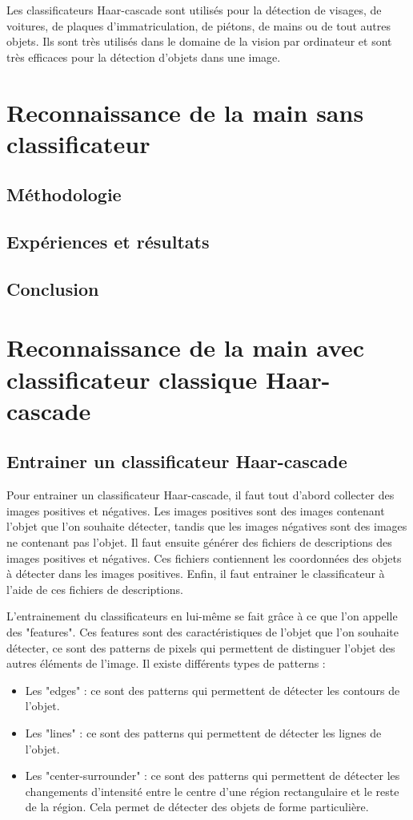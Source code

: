 \documentclass[11pt]{article}
\begin{document}
Les classificateurs Haar-cascade sont utilisés pour la détection de visages, de voitures, de plaques d'immatriculation, de piétons, de mains ou de tout autres objets. Ils sont très utilisés dans le domaine de la vision par ordinateur et sont très efficaces pour la détection d'objets dans une image. \bigbreak

\newpage

\section{Reconnaissance de la main sans classificateur}
\subsection{Méthodologie}
\subsection{Expériences et résultats}
\subsection{Conclusion}
\newpage

\section{Reconnaissance de la main avec classificateur classique Haar-cascade}
\subsection{Entrainer un classificateur Haar-cascade}
Pour entrainer un classificateur Haar-cascade, il faut tout d'abord collecter des images positives et négatives. Les images positives sont des images contenant l'objet que l'on souhaite détecter, tandis que les images négatives sont des images ne contenant pas l'objet. Il faut ensuite générer des fichiers de descriptions des images positives et négatives. Ces fichiers contiennent les coordonnées des objets à détecter dans les images positives. Enfin, il faut entrainer le classificateur à l'aide de ces fichiers de descriptions. \bigbreak

L'entrainement du classificateurs en lui-même se fait grâce à ce que l'on appelle des "features". Ces features sont des caractéristiques de l'objet que l'on souhaite détecter, ce sont des patterns de pixels qui permettent de distinguer l'objet des autres éléments de l'image. Il existe différents types de patterns :
\begin{itemize}
    \item Les "edges" : ce sont des patterns qui permettent de détecter les contours de l'objet.
    \item Les "lines" : ce sont des patterns qui permettent de détecter les lignes de l'objet.
    \item Les "center-surrounder" : ce sont des patterns qui permettent de détecter les changements d'intensité entre le centre d'une région rectangulaire et le reste de la région. Cela permet de détecter des objets de forme particulière.
\end{itemize}
\end{document}
